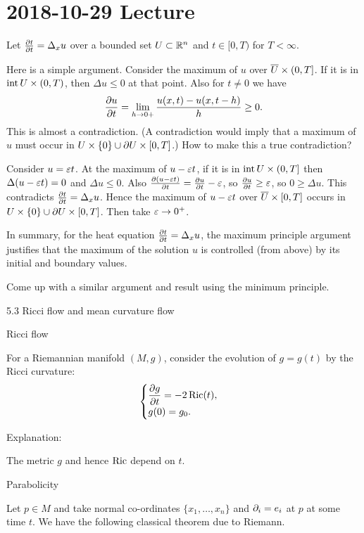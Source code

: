 \section{2018-10-29 Lecture}

Let $\tfrac{\partial t}{\partial t}=\Delta_x u$ over a bounded set $U \subset \mathbb{R}^n$ and $t\in[0,T)$ for $T<\infty$.

Here is a simple argument.
Consider the maximum of $u$ over $\overline U\times(0,T]$.
If it is in $\operatorname{int} U\times(0,T)$, then $\Delta u\leq 0$ at that point.
Also for $t\neq0$ we have
\[ \frac{\partial u}{\partial t} = \lim_{h\to0+} \frac{u(x,t)-u(x,t-h)}{h} \geq 0. \]
This is almost a contradiction.
(A contradiction would imply that a maximum of $u$ must occur in $U \times \{0\} \cup \partial U \times [0,T]$.)
How to make this a true contradiction?

Consider $u=\varepsilon t$.
At the maximum of $u-\varepsilon t$, if it is in $\operatorname{int} U\times(0,T]$ then $\Delta(u-\varepsilon t)=0$ and $\Delta u\leq0$.
Also $\tfrac{\partial(u-\varepsilon t)}{\partial t} = \tfrac{\partial u}{\partial t}-\varepsilon$, so $\tfrac{\partial u}{\partial t}\geq\varepsilon$, so $0\geq\Delta u$.
This contradicts $\tfrac{\partial t}{\partial t}=\Delta_x u$.
Hence the maximum of $u-\varepsilon t$ over $\overline U\times[0,T]$ occurs in $U \times \{0\} \cup \partial U \times [0,T]$.
Then take $\varepsilon\to0^+$.

In summary, for the heat equation $\tfrac{\partial t}{\partial t}=\Delta_x u$, the maximum principle argument justifies that the maximum of the solution $u$ is controlled (from above) by its initial and boundary values.

\begin{exer}
  Come up with a similar argument and result using the minimum principle.
\end{exer}

5.3 Ricci flow and mean curvature flow

Ricci flow

For a Riemannian manifold $(M,g)$, consider the evolution of $g=g(t)$ by the Ricci curvature:
\begin{equation*}
  \begin{cases}
    \displaystyle \frac{\partial g}{\partial t} = -2\operatorname{Ric}(t), \\
    g(0)=g_0.
  \end{cases}
\end{equation*}

Explanation:

The metric $g$ and hence $\operatorname{Ric}$ depend on $t$.

Parabolicity

Let $p\in M$ and take normal co-ordinates $\{x_1,\ldots,x_n\}$ and $\partial_i=e_i$ at $p$ at some time $t$.
We have the following classical theorem due to Riemann.

